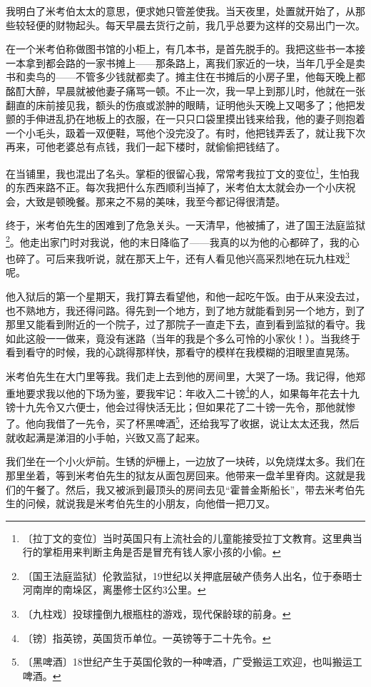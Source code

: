 \documentclass[12pt,UTF-8,openany]{ctexbook}
\begin{document}
\begin{normalsize}
    我明白了米考伯太太的意思，便求她只管差使我。当天夜里，处置就开始了，从那些较轻便的财物起头。每天早晨去货行之前，我几乎总要为这样的交易出门一次。
    
    在一个米考伯称做图书馆的小柜上，有几本书，是首先脱手的。我把这些书一本接一本拿到都会路的一家书摊上——那条路上，离我们家近的一块，当年几乎全是卖书和卖鸟的——不管多少钱就都卖了。摊主住在书摊后的小房子里，他每天晚上都酩酊大醉，早晨就被他妻子痛骂一顿。不止一次，我一早上到那儿时，他就在一张翻直的床前接见我，额头的伤痕或淤肿的眼睛，证明他头天晚上又喝多了；他把发颤的手伸进乱扔在地板上的衣服，在一只只口袋里摸出钱来给我，他的妻子则抱着一个小毛头，趿着一双便鞋，骂他个没完没了。有时，他把钱弄丢了，就让我下次再来，可他老婆总有点钱，我们一起下楼时，就偷偷把钱结了。
    
    在当铺里，我也混出了名头。掌柜的很留心我，常常考我拉丁文的变位\footnote{〔拉丁文的变位〕当时英国只有上流社会的儿童能接受拉丁文教育。这里典当行的掌柜用来判断主角是否是冒充有钱人家小孩的小偷。}，生怕我的东西来路不正。每次我把什么东西顺利当掉了，米考伯太太就会办一个小庆祝会，大致是顿晚餐。那来之不易的美味，我至今都记得很清楚。
    
    终于，米考伯先生的困难到了危急关头。一天清早，他被捕了，进了国王法庭监狱\footnote{〔国王法庭监狱〕伦敦监狱，19世纪以关押底层破产债务人出名，位于泰晤士河南岸的南垛区，离墨修士区约3公里。}。他走出家门时对我说，他的末日降临了——我真的以为他的心都碎了，我的心也碎了。可后来我听说，就在那天上午，还有人看见他兴高采烈地在玩九柱戏\footnote{〔九柱戏〕投球撞倒九根瓶柱的游戏，现代保龄球的前身。}呢。
    
    他入狱后的第一个星期天，我打算去看望他，和他一起吃午饭。由于从来没去过，也不熟地方，我还得问路。得先到一个地方，到了地方就能看到另一个地方，到了那里又能看到附近的一个院子，过了那院子一直走下去，直到看到监狱的看守。我如此这般一一做来，竟没有迷路（当年的我是个多么可怜的小家伙！）。当我终于看到看守的时候，我的心跳得那样快，那看守的模样在我模糊的泪眼里直晃荡。
    
    米考伯先生在大门里等我。我们走上去到他的房间里，大哭了一场。我记得，他郑重地要求我以他的下场为鉴，要我牢记：年收入二十镑\footnote{〔镑〕指英镑，英国货币单位。一英镑等于二十先令。}的人，如果每年花去十九镑十九先令又六便士，他会过得快活无比；但如果花了二十镑一先令，那他就惨了。他向我借了一先令，买了杯黑啤酒\footnote{〔黑啤酒〕18世纪产生于英国伦敦的一种啤酒，广受搬运工欢迎，也叫搬运工啤酒。}，还给我写了收据，说让太太还我，然后就收起满是涕泪的小手帕，兴致又高了起来。
    
    我们坐在一个小火炉前。生锈的炉栅上，一边放了一块砖，以免烧煤太多。我们在那里坐着，等到米考伯先生的狱友从面包房回来。他带来一盘羊里脊肉。这就是我们的午餐了。然后，我又被派到最顶头的房间去见“霍普金斯船长”，带去米考伯先生的问候，就说我是米考伯先生的小朋友，向他借一把刀叉。
    

\end{normalsize}
\end{document}
